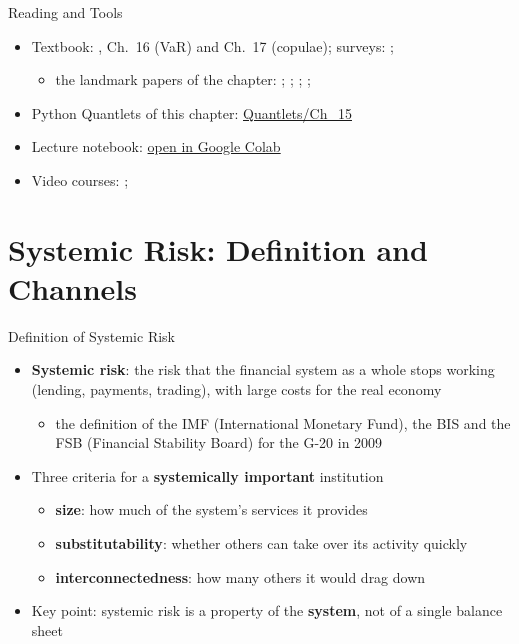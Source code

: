 \begin{frame}{Reading and Tools}
\itemsize{\small}
\begin{itemize}
    \item Textbook: , Ch.~16 (VaR) and Ch.~17 (copulae); surveys: ; 
    \begin{itemize}
        \item the landmark papers of the chapter: ; ; ; ; 
    \end{itemize}
    \item Python Quantlets of this chapter: \href{https://github.com/danpele/SFM/tree/main/Quantlets/Ch_15}{Quantlets/Ch\_15}
    \item Lecture notebook: \href{\colaburl{notebooks/EN/chapter15_lecture_notebook.ipynb}}{open in Google Colab}
    \item Video courses: ; 
\end{itemize}
\end{frame}


\section{Systemic Risk: Definition and Channels}

\begin{frame}{Definition of Systemic Risk}
\itemsize{\small}
\begin{itemize}
    \item \textbf{Systemic risk}: the risk that the financial system as a whole stops working (lending, payments, trading), with large costs for the real economy 
    \begin{itemize}
        \item the definition of the IMF (International Monetary Fund), the BIS and the FSB (Financial Stability Board) for the G-20 in 2009
    \end{itemize}
    \item Three criteria for a \textbf{systemically important} institution 
    \begin{itemize}
        \item \textbf{size}: how much of the system's services it provides
        \item \textbf{substitutability}: whether others can take over its activity quickly
        \item \textbf{interconnectedness}: how many others it would drag down
    \end{itemize}
    \item Key point: systemic risk is a property of the \textbf{system}, not of a single balance sheet
\end{itemize}
\end{frame}


